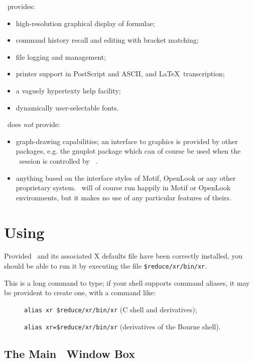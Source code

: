 \xr\ provides:
\begin{itemize}
\item high-resolution graphical display of formulae;
\item command history recall and editing with bracket matching;
\item file logging and management;
\item printer support in PostScript and ASCII, and \LaTeX\ transcription;
\item a vaguely hypertexty help facility;
\item dynamically user-selectable fonts.
\end{itemize}

\xr\ does {\it not\/} provide:
\begin{itemize}
\item graph-drawing capabilities; an interface to graphics is provided
by other packages, e.g. the gnuplot package which can of course be used
when the \REDUCE\ session is controlled by \xr\ .
\item anything based on the interface styles of Motif, OpenLook or any
other proprietary system.  \xr\ will of course run happily in Motif or
OpenLook environments, but it makes no use of any particular features
of theirs.
\end{itemize}

\newpage
\section{Using \xr}

Provided \xr\ and its associated X defaults file have been correctly
installed, you should be able to run it by executing the file
{\tt\$reduce/xr/bin/xr}.

This is a long command to type; if your shell supports command
aliases, it may be provident to create one, with a command like:
\begin{description}

\item[] {\tt alias xr \$reduce/xr/bin/xr}\hskip 1pc (C shell and derivatives);
\item[] {\tt alias xr=\$reduce/xr/bin/xr}\hskip 1pc (derivatives of
the Bourne shell).
\end{description}

\subsection{The Main \xr\ Window Box}

